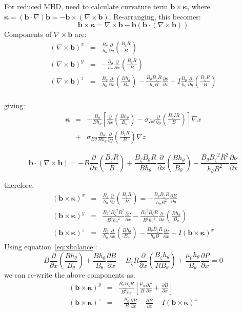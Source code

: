 \documentclass[12pt, a4paper]{article}
\newcommand{\deriv}[2]{\ensuremath{\frac{\partial #1}{\partial #2}}}
\newcommand{\hthe}{\ensuremath{h_\theta}}
\newcommand{\Bp}{\ensuremath{B_\theta}}
\newcommand{\Bt}{\ensuremath{B_\zeta}}
\newcommand{\Vec}[1]{\ensuremath{\mathbf{#1}}}
\newcommand{\bvec}{\Vec{b}}
\newcommand{\sbp}{\ensuremath{\sigma_{B\theta}}}
\begin{document}
For reduced MHD, need to calculate curvature term $\mathbf{b}\times\mathbf{\kappa}$, where
$\mathbf{\kappa} = \left(\bvec\cdot\nabla\right)\bvec = -\mathbf{b}\times\left(\nabla\times\mathbf{b}\right)$. Re-arranging, this becomes:
\[
\mathbf{b}\times\mathbf{\kappa} = \nabla\times\mathbf{b} - \mathbf{b}\left(\mathbf{b}\cdot\left(\nabla\times\mathbf{b}\right)\right)
\]
Components of $\nabla\times\mathbf{b}$ are:
\begin{eqnarray*}
\left(\nabla\times\mathbf{b}\right)^x &=& \frac{\Bp}{\hthe}\deriv{}{y}\left(\frac{\Bt R}{B}\right) \\
\left(\nabla\times\mathbf{b}\right)^y &=& -\frac{\Bp}{\hthe}\deriv{}{x}\left(\frac{\Bt R}{B}\right) \\
\left(\nabla\times\mathbf{b}\right)^z &=& \frac{\Bp}{\hthe}\deriv{}{x}\left(\frac{B\hthe}{\Bp}\right) - \frac{\Bp\Bt R}{\hthe B}\deriv{\nu}{x} - I\frac{\Bp}{\hthe}\deriv{}{y}\left(\frac{\Bt R}{B}\right) \\
\end{eqnarray*}

giving:
\begin{eqnarray}
\mathbf{\kappa} &=& -\frac{B_\theta}{B h_\theta}\left[\deriv{}{x}\left(\frac{B h_\theta}{B_\theta}\right) - \sbp\deriv{}{y}\left(\frac{B_\zeta I R}{B}\right)\right]\nabla x \nonumber \\
&+& \sbp\frac{B_\theta}{B h_\theta}\deriv{}{y}\left(\frac{B_\zeta R}{B}\right)\nabla z
\label{eq:curvature}
\end{eqnarray}

\[
\mathbf{b}\cdot\left(\nabla\times\mathbf{b}\right) = -B\deriv{}{x}\left(\frac{\Bt R}{B}\right) + \frac{\Bt\Bp R}{B\hthe}\deriv{}{x}\left(\frac{B\hthe}{\Bp}\right) - \frac{\Bp\Bt^2R^2}{\hthe B^2}\deriv{\nu}{x}
\]

therefore,
\begin{eqnarray*}
\left(\mathbf{b}\times\mathbf{\kappa}\right)^x &=& \frac{\Bp}{\hthe}\deriv{}{y}\left(\frac{\Bt R}{B}\right) = -\frac{\Bp\Bt R}{\hthe B^2}\deriv{B}{y} \\
\left(\mathbf{b}\times\mathbf{\kappa}\right)^y &=& \frac{\Bp^2\Bt^2 R^2}{B^3\hthe^2}\deriv{\nu}{x} - \frac{\Bp^2\Bt R}{B^2\hthe^2}\deriv{}{x}\left(\frac{B\hthe}{\Bp}\right) \\
\left(\mathbf{b}\times\mathbf{\kappa}\right)^z &=& \frac{\Bp}{\hthe}\deriv{}{x}\left(\frac{B\hthe}{\Bp}\right) - \frac{\Bp\Bt R}{\hthe B}\deriv{\nu}{x} - I\left(\mathbf{b}\times\mathbf{\kappa}\right)^x
\end{eqnarray*}
Using equation~\ref{eq:xbalance}:
\[
B\deriv{}{x}\left(\frac{B\hthe}{\Bp}\right) + \frac{B\hthe}{\Bp}\deriv{B}{x} - \Bt R\deriv{}{x}\left(\frac{\Bt\hthe}{R\Bp}\right) + \frac{\mu_0\hthe}{\Bp}\deriv{P}{x} = 0
\]
we can re-write the above components as:
\begin{eqnarray*}
\left(\mathbf{b}\times\mathbf{\kappa}\right)^y &=& \frac{\Bp\Bt R}{B^2\hthe}\left[\frac{\mu_0}{B}\deriv{P}{x} + \deriv{B}{x}\right] \\
\left(\mathbf{b}\times\mathbf{\kappa}\right)^z &=& -\frac{\mu_0}{B}\deriv{P}{x} - \deriv{B}{x} - I\left(\mathbf{b}\times\mathbf{\kappa}\right)^x
\end{eqnarray*}
\end{document}
